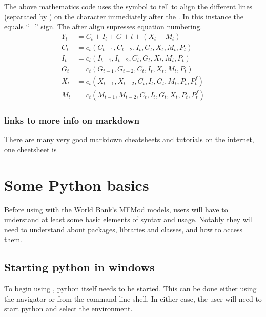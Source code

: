\documentclass[letterpaper,10pt,english]{jupyterBook}
\begin{document}
\sphinxAtStartPar
The above  mathematics code uses the  \sphinxcode{\sphinxupquote{\&}} symbol to tell  to align the different lines (separated by \sphinxcode{\sphinxupquote{\textbackslash{}\textbackslash{}}}) on the character immediately after the \sphinxcode{\sphinxupquote{\&}}. In this instance the equals “=” sign.  The \sphinxcode{\sphinxupquote{*}} after align supresses equation numbering.
\begin{align*}
Y_t  &=  C_t+I_t+G+t+ (X_t-M_t) \\
C_t &= c_t(C_{t-1},C_{t-2},I_t,G_t,X_t,M_t,P_t)\\
I_t &= c_t(I_{t-1},I_{t-2},C_t,G_t,X_t,M_t,P_t)\\
G_t &= c_t(G_{t-1},G_{t-2},C_t,I_t,X_t,M_t,P_t)\\
X_t &= c_t(X_{t-1},X_{t-2},C_t,I_t,G_t,M_t,P_t,P^f_t)\\
M_t &= c_t(M_{t-1},M_{t-2},C_t,I_t,G_t,X_t,P_t,P^f_t)
\end{align*}

\subsection{links to more info on markdown}
\label{\detokenize{content/04_PythonEssentials/Intro_Jupyter_notebook:links-to-more-info-on-markdown}}
\sphinxAtStartPar
There are many very good markdown cheatsheets and tutorials on the internet, one cheetsheet is 

\sphinxstepscope


\chapter{Some Python basics}
\label{\detokenize{content/04_PythonEssentials/PythonPandasDataframes:some-python-basics}}\label{\detokenize{content/04_PythonEssentials/PythonPandasDataframes::doc}}
\sphinxAtStartPar
Before using  with the World Bank’s MFMod models, users  will have to understand at least some basic elements of  syntax and usage.  Notably they will need to understand about packages, libraries and classes, and how to access them.


\section{Starting python in windows}
\label{\detokenize{content/04_PythonEssentials/PythonPandasDataframes:starting-python-in-windows}}
\sphinxAtStartPar
To begin using , python itself needs to be started.  This can be done either using the  navigator or from the command line shell. In either case, the user will need to start python and select the  environment.
\end{document}
